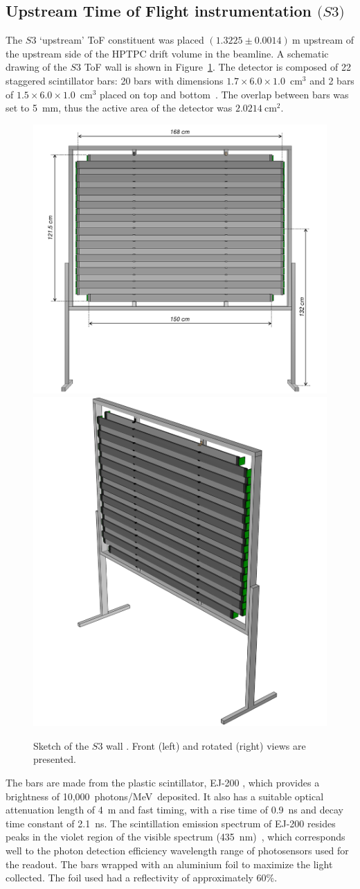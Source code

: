 \subsection{Upstream Time of Flight instrumentation $\mathit(S3)$}
\label{subsec:s3Exp}
The $\mathit{S3}$ `upstream' ToF constituent was placed $(1.3225 \pm 0.0014)~\text{m}$ upstream of the upstream side of the HPTPC drift volume in the beamline.
A schematic drawing of the $\mathit{S3}$ ToF wall is shown in Figure~\ref{fig:S3sketch}.
The detector is composed of 22 staggered scintillator bars:  20 bars with dimensions $1.7 \times 6.0 \times 1.0$~cm$^3$ and 2 bars of  $1.5 \times 6.0 \times 1.0$~cm$^3$ placed on top and bottom~\cite{S3-proceedings}.
The overlap between bars was set to 5~mm, thus the active area of the detector was $2.0214~\text{cm}^{2}$.

\begin{figure}
  \centering
  \includegraphics[width=0.54\linewidth]{files/Figures/uToF_sketch.pdf}
  \hfill
  \includegraphics[width=0.43\linewidth]{files/Figures/uTOF_rot.pdf}
  \caption{Sketch of the $\mathit{S3}$ wall \cite{S3-proceedings}.
  Front (left) and rotated (right) views are presented.}
  \label{fig:S3sketch}
\end{figure}

The bars are made from the plastic scintillator, EJ-200 \cite{SCIONIX}, which provides a brightness of 10,000~photons/MeV~deposited.
It also has a suitable optical attenuation length of 4~m and fast timing, with a rise time of 0.9~ns and decay time constant of 2.1~ns.
The scintillation emission spectrum of EJ-200 resides peaks in the violet region of the visible spectrum (435~nm)~\cite{EJ200}, which corresponds well to the photon detection efficiency wavelength range of photosensors used for the readout.
The bars wrapped with an aluminium foil to maximize the light collected.
The foil used had a reflectivity of approximately 60\%.


